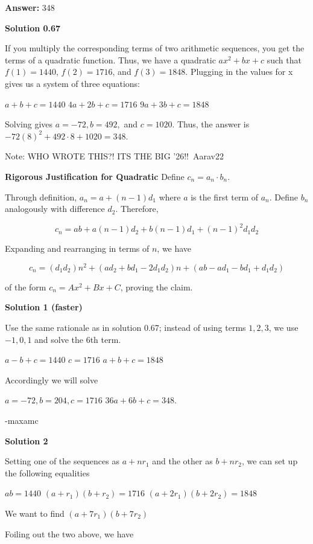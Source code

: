 \begin{enumerate}
 
 \textbf{Answer: }348



\textbf{Solution 0.67}

If you multiply the corresponding terms of two arithmetic sequences, you get the terms of a quadratic function. Thus, we have a quadratic $ax^2+bx+c$ such that $f(1)=1440$, $f(2)=1716$, and $f(3)=1848$. Plugging in the values for x gives us a system of three equations:

 $a+b+c=1440$
$4a+2b+c=1716$
$9a+3b+c=1848$

 Solving gives $a=-72, b=492,$ and $c=1020$. Thus, the answer is $-72(8)^2+492\cdot8+1020= \boxed{348}.$

 
Note: WHO WROTE THIS?! ITS THE BIG '26!!~Aarav22

 \textbf{Rigorous Justification for Quadratic} Define $c_n = a_n \cdot b_n$.

 Through definition, $a_n = a + (n-1)d_1$ where $a$ is the first term of $a_n$. Define $b_n$ analogously with difference $d_2$. Therefore,

 
 \[c_n = ab + a(n - 1)d_2 + b(n - 1)d_1 + (n - 1)^2 d_1d_2\]

 Expanding and rearranging in terms of $n$, we have

 
 \[c_n = (d_1d_2)n^2 + (ad_2 + bd_1 - 2d_1d_2)n + (ab - ad_1 - bd_1 + d_1d_2)\]

 of the form $c_n = Ax^2 + Bx + C$, proving the claim.

 



\textbf{Solution 1 (faster)}

Use the same rationale as in solution 0.67; instead of using terms $1,2,3$, we use $-1,0,1$ and solve the $6$th term.

 $a-b+c=1440$
$c=1716$
$a+b+c=1848$

 Accordingly we will solve 

 $a=-72, b=204, c=1716$
$36a+6b+c= \boxed{348}.$

 -maxamc

 



\textbf{Solution 2}

Setting one of the sequences as $a+nr_1$ and the other as $b+nr_2$, we can set up the following equalities

 $ab = 1440$
$(a+r_1)(b+r_2)=1716$
$(a+2r_1)(b+2r_2)=1848$

 We want to find $(a+7r_1)(b+7r_2)$

 Foiling out the two above, we have


\end{enumerate}
